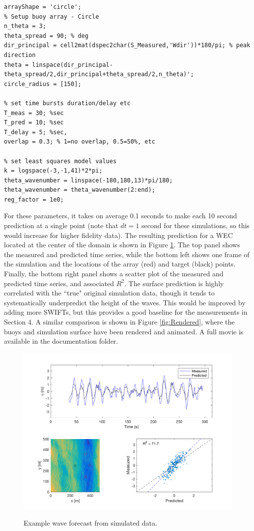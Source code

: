 \documentclass[11pt]{article}
\begin{document}
\lstset{language=Matlab}
 \begin{lstlisting}
arrayShape = 'circle';
% Setup buoy array - Circle
n_theta = 3;
theta_spread = 90; % deg
dir_principal = cell2mat(dspec2char(S_Measured,'Wdir'))*180/pi; % peak direction
theta = linspace(dir_principal-theta_spread/2,dir_principal+theta_spread/2,n_theta)';
circle_radius = [150];

% set time bursts duration/delay etc
T_meas = 30; %sec
T_pred = 10; %sec
T_delay = 5; %sec,
overlap = 0.3; % 1=no overlap, 0.5=50%, etc

% set least squares model values
k = logspace(-3,-1,41)*2*pi;
theta_wavenumber = linspace(-180,180,13)*pi/180;
theta_wavenumber = theta_wavenumber(2:end);
reg_factor = 1e0;
\end{lstlisting}

For these parameters, it takes on average 0.1 seconds to make each 10 second prediction at a single point (note that $dt=1$ second for these simulations, so this would increase for higher fidelity data).  The resulting prediction for a WEC located at the center of the domain is shown in Figure \ref{fig:SimulationPointComparison}.  The top panel shows the measured and predicted time series, while the bottom left shows one frame of the simulation and the locations of the array (red) and target (black) points.  Finally, the bottom right panel shows a scatter plot of the measured and predicted time series, and associated $R^2$.  The surface prediction is highly correlated with the ``true" original simulation data, though it tends to systematically underpredict the height of the waves.  This would be improved by adding more SWIFTs, but this provides a good baseline for the  measurements in Section 4.  A similar comparison is shown in Figure \ref{fig:Rendered}, where the buoys and simulation surface have been rendered and animated.  A full movie is available in the documentation folder.

\begin{figure}[t]
    \centering
    \noindent\includegraphics[width=5.5in]{PointPrediction.png}\\
   \vspace{-0in}\caption{Example wave forecast from simulated data.}\label{fig:SimulationPointComparison}
\end{figure}
\end{document}
